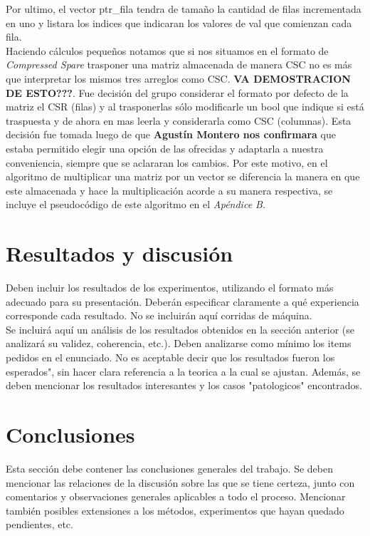 \documentclass[a4paper]{article}
\begin{document}
\indent Por ultimo, el vector ptr_fila tendra de tamaño la cantidad de filas incrementada en uno y listara los indices que indicaran los valores de val que comienzan cada fila.\\
\indent Haciendo c\'alculos pequeños notamos que si nos situamos en el formato de \textit{Compressed Spare} trasponer una matriz almacenada de manera CSC no es m\'as que interpretar los mismos tres arreglos como CSC. \textbf{ VA DEMOSTRACION DE ESTO???}. Fue decisi\'on del grupo considerar el formato por defecto de la matriz el CSR (filas) y al trasponerlas s\'olo modificarle un bool que indique si est\'a traspuesta y de ahora en mas leerla y considerarla como CSC (columnas). Esta decisión fue tomada luego de que \textbf{Agust\'in Montero nos confirmara} que estaba permitido elegir una opción de las ofrecidas y adaptarla a nuestra conveniencia, siempre que se aclararan los cambios. Por este motivo, en el algoritmo de multiplicar una matriz por un vector se diferencia la manera en que este almacenada y hace la multiplicaci\'on acorde a su manera respectiva, se incluye el pseudoc\'odigo de este algoritmo en el \emph{Ap\'endice B}. \\


\newpage
\section{Resultados y discusi\'on}
Deben incluir los resultados de los experimentos, utilizando el formato m\'as adecuado
para su presentaci\'on. Deber\'an especificar claramente a qu\'e experiencia corresponde
cada resultado. No se incluir\'an aqu\'i corridas de m\'aquina.\\
Se incluir\'a aqu\'i un an\'alisis de los resultados obtenidos en la secci\'on anterior (se analizar\'a su validez, coherencia, etc.). Deben analizarse como m\'inimo los items pedidos en el enunciado. No es aceptable decir que los resultados fueron los esperados", sin hacer
clara referencia a la teorica a la cual se ajustan. Adem\'as, se deben mencionar los resultados
interesantes y los casos "patologicos" encontrados.

\newpage
\section{Conclusiones}
Esta secci\'on debe contener las conclusiones generales del trabajo. Se deben mencionar
las relaciones de la discusi\'on sobre las que se tiene certeza, junto con comentarios
y observaciones generales aplicables a todo el proceso. Mencionar tambi\'en posibles
extensiones a los m\'etodos, experimentos que hayan quedado pendientes, etc.
\end{document}
